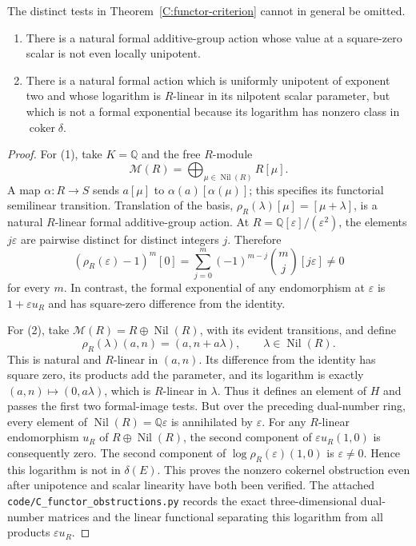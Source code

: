 \begin{proposition}
\label{C:functor-separate-obstructions}
The distinct tests in Theorem~\ref{C:functor-criterion} cannot in general be omitted.
\begin{enumerate}
\item There is a natural formal additive-group action whose value at a square-zero scalar is not even locally unipotent.
\item There is a natural formal action which is uniformly unipotent of exponent two and whose logarithm is $R$-linear in its nilpotent scalar parameter, but which is not a formal exponential because its logarithm has nonzero class in $\operatorname{coker}\delta$.
\end{enumerate}
\end{proposition}
\begin{proof}
For (1), take $K=\mathbb Q$ and the free $R$-module
\[
 \mathcal M(R)=\bigoplus_{\mu\in\operatorname{Nil}(R)}R[\mu].
\]
A map $\alpha:R\to S$ sends $a[\mu]$ to $\alpha(a)[\alpha(\mu)]$; this specifies its functorial semilinear transition. Translation of the basis,
$\rho_R(\lambda)[\mu]=[\mu+\lambda]$, is a natural $R$-linear formal additive-group action. At $R=\mathbb Q[\varepsilon]/(\varepsilon^2)$, the elements $j\varepsilon$ are pairwise distinct for distinct integers $j$. Therefore
\[
 (\rho_R(\varepsilon)-1)^m[0]
   =\sum_{j=0}^m(-1)^{m-j}\binom mj[j\varepsilon]\ne0
\]
for every $m$. In contrast, the formal exponential of any endomorphism at $\varepsilon$ is $1+\varepsilon u_R$ and has square-zero difference from the identity.

For (2), take $\mathcal M(R)=R\oplus\operatorname{Nil}(R)$, with its evident transitions, and define
\[
 \rho_R(\lambda)(a,n)=(a,n+a\lambda),\qquad
 \lambda\in\operatorname{Nil}(R).
\]
This is natural and $R$-linear in $(a,n)$. Its difference from the identity has square zero, its products add the parameter, and its logarithm is exactly $(a,n)\mapsto(0,a\lambda)$, which is $R$-linear in $\lambda$. Thus it defines an element of $H$ and passes the first two formal-image tests. But over the preceding dual-number ring, every element of $\operatorname{Nil}(R)=\mathbb Q\varepsilon$ is annihilated by $\varepsilon$. For any $R$-linear endomorphism $u_R$ of $R\oplus\operatorname{Nil}(R)$, the second component of $\varepsilon u_R(1,0)$ is consequently zero. The second component of $\log\rho_R(\varepsilon)(1,0)$ is $\varepsilon\ne0$. Hence this logarithm is not in $\delta(E)$. This proves the nonzero cokernel obstruction even after unipotence and scalar linearity have both been verified. The attached \texttt{code/C\_functor\_obstructions.py} records the exact three-dimensional dual-number matrices and the linear functional separating this logarithm from all products $\varepsilon u_R$.
\end{proof}

